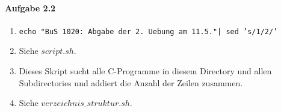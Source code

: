 \documentclass[11pt]{article}
\begin{document}

\paragraph{Aufgabe 2.2}
\begin{enumerate}[label = \alph*)]
\item \texttt{echo "BuS 1020: Abgabe der 2. Uebung am 11.5."| sed 's/1/2/'}
\item Siehe $script.sh$.

\item Dieses Skript sucht alle C-Programme in diesem Directory und allen Subdirectories und addiert die Anzahl der Zeilen zusammen.

\item Siehe $verzeichnis\_struktur.sh$.

\end{enumerate}
\end{document}
